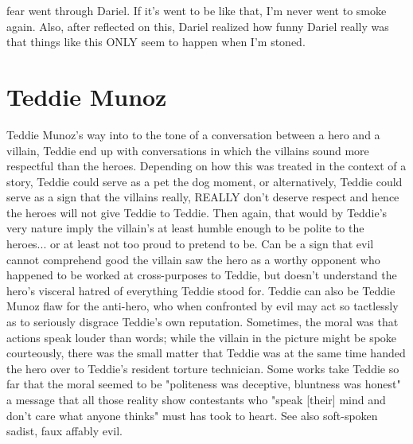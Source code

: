 \documentclass[12pt]{book}
\begin{document}
fear went through Dariel. If it's went to be like that, I'm never went to smoke again. Also, after reflected on this, Dariel realized how funny Dariel really was that things like this ONLY seem to happen when I'm stoned.



\chapter{Teddie Munoz}

Teddie Munoz's way into to the tone of a conversation between a hero and a villain, Teddie end up with conversations in which the villains sound more respectful than the heroes. Depending on how this was treated in the context of a story, Teddie could serve as a pet the dog moment, or alternatively, Teddie could serve as a sign that the villains really, REALLY don't deserve respect and hence the heroes will not give Teddie to Teddie. Then again, that would by Teddie's very nature imply the villain's at least humble enough to be polite to the heroes... or at least not too proud to pretend to be. Can be a sign that evil cannot comprehend good  the villain saw the hero as a worthy opponent who happened to be worked at cross-purposes to Teddie, but doesn't understand the hero's visceral hatred of everything Teddie stood for. Teddie can also be Teddie Munoz flaw for the anti-hero, who when confronted by evil may act so tactlessly as to seriously disgrace Teddie's own reputation. Sometimes, the moral was that actions speak louder than words; while the villain in the picture might be spoke courteously, there was the small matter that Teddie was at the same time handed the hero over to Teddie's resident torture technician. Some works take Teddie so far that the moral seemed to be "politeness was deceptive, bluntness was honest"  a message that all those reality show contestants who "speak [their] mind and don't care what anyone thinks" must has took to heart. See also soft-spoken sadist, faux affably evil.
\end{document}
